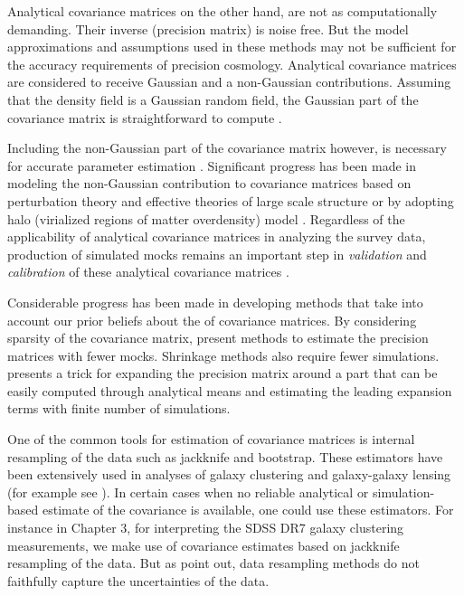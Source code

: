 Analytical covariance matrices on the other hand, are not as computationally demanding. 
Their inverse (precision matrix) is noise free. But the model approximations and assumptions used in these methods may not be sufficient for the accuracy requirements of precision cosmology. Analytical covariance matrices are considered to receive Gaussian and a non-Gaussian contributions. Assuming that the density field is a 
Gaussian random field, the Gaussian part of the covariance matrix is straightforward to compute \citep{grieb2016,klaus2016,slepian2016b}.

Including the non-Gaussian part of the covariance matrix however, is necessary for accurate parameter estimation \citep{takahashi2011,blot2016,chan2016}.
Significant progress has been made in modeling the non-Gaussian contribution to covariance matrices based on perturbation theory and effective theories of large scale structure \citep{mohammed_seljak,mohammed2017} or by adopting halo (virialized regions of matter overdensity) model \citep{takada_spergel,eifler2014}.
Regardless of the applicability of analytical covariance matrices in analyzing the survey data, production of simulated mocks remains an important step in \emph{validation} and \emph{calibration} of these analytical covariance matrices \citep{slepian2016b,hildebrandt2017}.

Considerable progress has been made in developing methods that take into account our prior beliefs 
about the of covariance matrices. By considering sparsity of the covariance matrix, \citet{paz2015,padmanabhan2016} 
present methods to estimate the precision matrices with fewer mocks. Shrinkage methods \citep{pope2008,joachimi2016} 
also require fewer simulations. \citet{fried2017} presents a trick for expanding the precision matrix 
around a part that can be easily computed through analytical means and estimating the leading expansion terms with finite number of simulations.

One of the common tools for estimation of covariance matrices is internal resampling of the data such as jackknife and bootstrap. These estimators have been extensively used in analyses of galaxy clustering and galaxy-galaxy lensing (for example see \citealt{reid2014,hod_vs_sham,singh2016,shirasaki,kwan2017}).
In certain cases when no reliable analytical or simulation-based estimate of the covariance is available, one could use these estimators. 
For instance in Chapter 3, for interpreting the SDSS DR7 galaxy clustering measurements, 
we make use of covariance estimates based on jackknife resampling of the data. But as \citet{norberg,fried2016} point out, data resampling methods do not faithfully capture the uncertainties of the data. 

